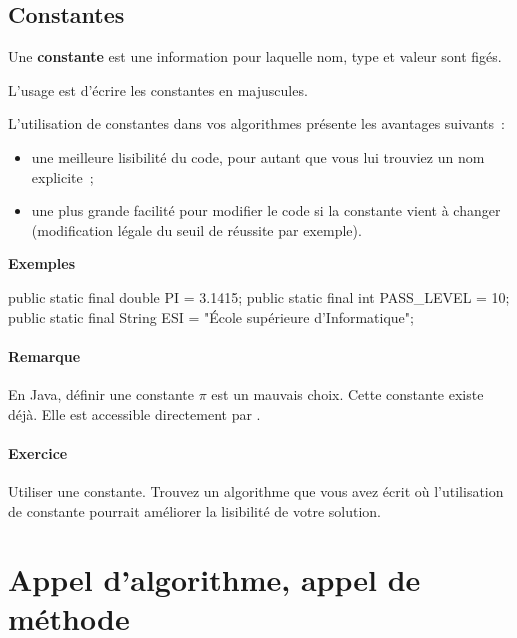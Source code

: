 		\subsection{Constantes}
	
			Une \textbf{constante} est une information pour laquelle nom, type
			et valeur sont figés. 

			L'usage est d'écrire les constantes en majuscules. 
			
			L’utilisation de constantes dans vos algorithmes présente
			les avantages suivants~:
			\begin{itemize}
			\item
				une meilleure lisibilité du code,
				pour autant que vous lui trouviez un nom explicite~;
			\item
				une plus grande facilité pour modifier le code
				si la constante vient à changer 
				(modification légale du seuil de réussite par exemple).
			\end{itemize}
			
			\textbf{Exemples}
			
			\begin{java}
public static final double PI = 3.1415;
public static final int PASS_LEVEL = 10;
public static final String ESI = "École supérieure d'Informatique";
			\end{java}

			\paragraph{Remarque}

			En Java, définir une constante $\pi$ est un mauvais choix. Cette 
			constante existe déjà. Elle est accessible directement 
			par .

		
			\begin{Emphase}
				\paragraph{Exercice}
				Utiliser une constante.
				Trouvez un algorithme que vous avez écrit
				où l’utilisation de constante
				pourrait améliorer la lisibilité de votre solution.
			\end{Emphase}
			
	\section{Appel d'algorithme, appel de méthode}
	
